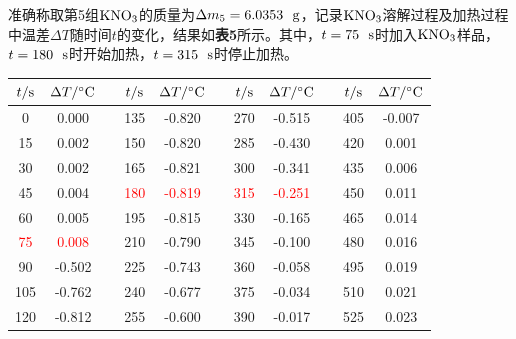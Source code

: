 \documentclass[12pt]{article}
\begin{document}
准确称取第5组$\rm KNO_{3}$的质量为$\Delta m_{5}=6.0353\ \ {\rm g}$，记录$\rm KNO_{3}$溶解过程及加热过程中温差$\Delta T$随时间$t$的变化，结果如\textbf{表5}所示。其中，$t=75\ \ {\rm s}$时加入$\rm KNO_{3}$样品，$t=180\ \ {\rm s}$时开始加热，$t=315\ \ {\rm s}$时停止加热。
\begin{table}[h]
	\centering
	\begin{tabular}{ccccccccccc}
		\toprule
		$t/{\rm s}$ & $\Delta T/{\rm ^{\circ}C}$ & & $t/{\rm s}$ & $\Delta T/{\rm ^{\circ}C}$& & 	$t/{\rm s}$ & $\Delta T/{\rm ^{\circ}C}$ & & $t/{\rm s}$ & $\Delta T/{\rm ^{\circ}C}$ \\
		\midrule
		0   & 0.000  &  & 135 & -0.820 &  & 270 & -0.515 &  & 405 & -0.007 \\
		15  & 0.002  &  & 150 & -0.820 &  & 285 & -0.430 &  & 420 & 0.001  \\
		30  & 0.002  &  & 165 & -0.821 &  & 300 & -0.341 &  & 435 & 0.006  \\
		45  & 0.004  &  & \textcolor{red}{180} & \textcolor{red}{-0.819} &  & \textcolor{red}{315} & \textcolor{red}{-0.251} &  & 450 & 0.011  \\
		60  & 0.005  &  & 195 & -0.815 &  & 330 & -0.165 &  & 465 & 0.014  \\
		\textcolor{red}{75}  & \textcolor{red}{0.008}  &  & 210 & -0.790 &  & 345 & -0.100 &  & 480 & 0.016  \\
		90  & -0.502 &  & 225 & -0.743 &  & 360 & -0.058 &  & 495 & 0.019  \\
		105 & -0.762 &  & 240 & -0.677 &  & 375 & -0.034 &  & 510 & 0.021  \\
		120 & -0.812 &  & 255 & -0.600 &  & 390 & -0.017 &  & 525 & 0.023  \\
		\bottomrule
	\end{tabular}
\end{table}
\par
\end{document}
